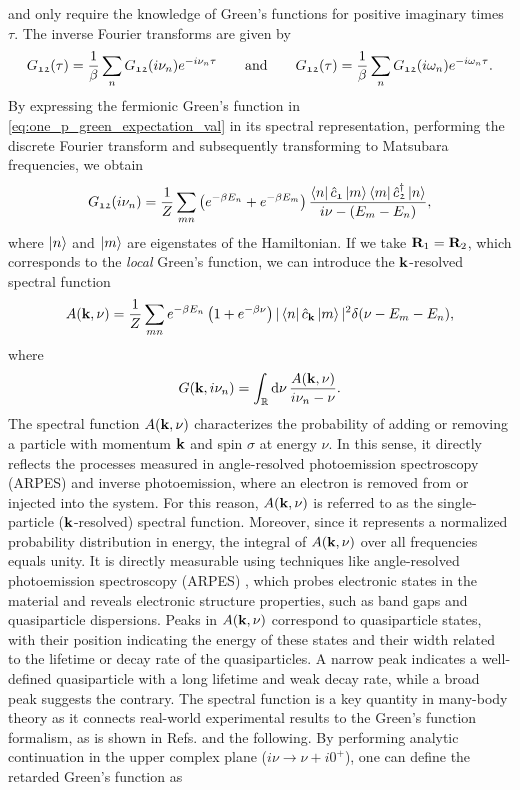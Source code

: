 \documentclass[../../main.tex]{subfiles}
\begin{document}
and only require the knowledge of Green's functions for positive imaginary times $\tau$. The inverse Fourier transforms are given by
\begin{align}
	G_{\mathfrak{12}}(\tau)=\frac1\beta \sum_n G_{\mathfrak{12}}(i\nu_n) e^{-i\nu_n\tau} \qquad\text{and}\qquad G_{\mathfrak{12}}(\tau)=\frac1\beta \sum_n G_{\mathfrak{12}}(i\omega_n) e^{-i\omega_n\tau}.
\end{align}
By expressing the fermionic Green's function in \eqref{eq:one_p_green_expectation_val} in its spectral representation, performing the discrete Fourier transform and subsequently transforming to Matsubara frequencies, we obtain
\begin{align}
	G_{\mathfrak{12}}(i\nu_n)=\frac1Z\sum_{mn}\left (e^{-\beta E_n}+e^{-\beta E_m}\right )\frac{\bra{n} \hat c_{\mathfrak{1}} \ket{m}\bra{m} \hat c^{\dagger}_{\mathfrak{2}} \ket{n}}{i\nu-(E_m-E_n)},
\end{align}
where $\ket n$ and $\ket m$ are eigenstates of the Hamiltonian. If we take $\textbf{R}_1=\textbf{R}_2$, which corresponds to the \textit{local} Green's function, we can introduce the $\textbf{k}$-resolved spectral function
\begin{align}
	A(\textbf{k},\nu)=\frac1Z\sum_{mn} e^{-\beta E_n}\left (1+e^{-\beta\nu}\right ) |\bra{n} \hat c_{\textbf{k}} \ket{m}|^2 \delta(\nu-E_m-E_n),
\end{align}
where
\begin{align}
	G(\textbf{k},i\nu_n)=\int_{\mathbb{R}}^{}\text{d}\nu\,\frac{A(\textbf{k},\nu)}{i\nu_n-\nu}.
\end{align}
The spectral function $A(\textbf{k},\nu)$ characterizes the probability of adding or removing a particle with momentum $\textbf{k}$ and spin $\sigma$ at energy $\nu$. In this sense, it directly reflects the processes measured in angle-resolved photoemission spectroscopy (ARPES) and inverse photoemission, where an electron is removed from or injected into the system. For this reason, $A(\textbf{k},\nu)$ is referred to as the single-particle ($\textbf{k}$-resolved) spectral function. Moreover, since it represents a normalized probability distribution in energy, the integral of $A(\textbf{k},\nu)$ over all frequencies equals unity. It is directly measurable using techniques like angle-resolved photoemission spectroscopy (ARPES) \cite{Hwang2008, Jang2017}, which probes electronic states in the material and reveals electronic structure properties, such as band gaps and quasiparticle dispersions. Peaks in $A(\textbf{k},\nu)$ correspond to quasiparticle states, with their position indicating the energy of these states and their width related to the lifetime or decay rate of the quasiparticles. A narrow peak indicates a well-defined quasiparticle with a long lifetime and weak decay rate, while a broad peak suggests the contrary. The spectral function is a key quantity in many-body theory as it connects real-world experimental results to the Green's function formalism, as is shown in Refs. \cite{Hwang2008, Jang2017} and the following. By performing analytic continuation in the upper complex plane ($i\nu\to\nu+i0^{+}$), one can define the retarded Green's function as
\end{document}

